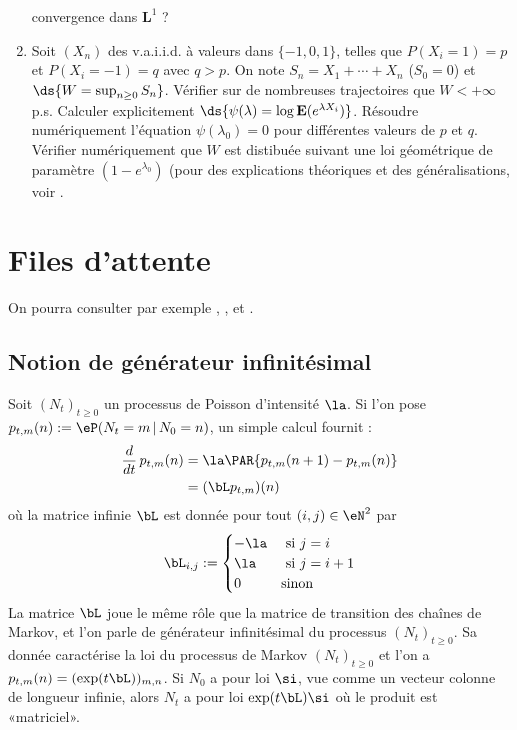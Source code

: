 \begin{enumerate}
  convergence dans $\mathbf{L}^1$ ?
\item Soit $(X_n)$ des v.a.i.i.d. à valeurs dans $\{-1,0,1\}$, telles que
  $P(X_i=1)=p$ et $P(X_i=-1)=q$ avec $q>p$. On note $S_n=X_1+\cdots+X_n$
  ($S_0=0$) et $\ds{W=\sup_{n \geq 0}S_n}$. Vérifier sur de
  nombreuses trajectoires que $W<+\infty$ p.s. Calculer explicitement
  $\ds{\psi(\lambda)=\log \mathbf{E}(e^{\lambda X_i})}$. Résoudre
  numériquement l'équation $\psi(\lambda_0)=0$ pour différentes valeurs de $p$
  et $q$. Vérifier numériquement que $W$ est distibuée suivant une loi
  géométrique de paramètre $(1-e^{\lambda_0})$ (pour des explications
  théoriques et des généralisations, voir \cite{baldi-mazliak-priouret}.
\end{enumerate}    

%
%
\chapter{Files d'attente}
%
%

On pourra consulter par exemple \cite{bon}, \cite{bouleau2},
\cite{dacunha-castelle-duflo-2} et \cite{ross-1}.


%
\section{Notion de générateur infinitésimal}
%

Soit $(N_t)_{t\geq 0}$ un processus de Poisson d'intensité $\la$. Si l'on pose
$p_{t,m}(n):=\eP(N_t=m\,\vert\,N_0=n)$, un simple calcul fournit :
\begin{align*}
\frac{d}{dt}\,p_{t,m}(n)
&=\la \PAR{p_{t,m}(n+1)-p_{t,m}(n)}\\
&=(\bL p_{t,m})(n)
\end{align*}
où la matrice infinie $\bL$ est donnée pour tout $(i,j)\in\eN^2$ par
$$
\bL_{i,j}:=
\begin{cases}
  -\la & \text{ si $j=i$} \\
  \la & \text{ si $j=i+1$} \\
  0 & \text{sinon}
\end{cases}
$$
La matrice $\bL$ joue le même rôle que la matrice de transition des chaînes
de Markov, et l'on parle de générateur infinitésimal du processus
$(N_t)_{t\geq 0}$. Sa donnée caractérise la loi du processus de Markov
$(N_t)_{t\geq 0}$ et l'on a $p_{t,m}(n)=(\exp(t\bL))_{m,n}$. Si $N_0$ a pour
loi $\si$, vue comme un vecteur colonne de longueur infinie, alors $N_t$ a
pour loi $\exp(t\bL)\si$ où le produit est «matriciel».


